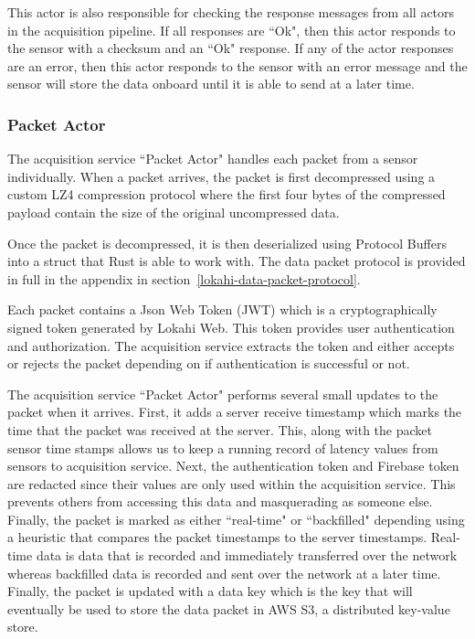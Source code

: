 This actor is also responsible for checking the response messages from all actors in the acquisition pipeline. If all responses are ``Ok", then this actor responds to the sensor with a checksum and an ``Ok" response. If any of the actor responses are an error, then this actor responds to the sensor with an error message and the sensor will store the data onboard until it is able to send at a later time.

\subsubsection{Packet Actor}
The acquisition service ``Packet Actor" handles each packet from a sensor individually. When a packet arrives, the packet is first decompressed using a custom LZ4 compression protocol where the first four bytes of the compressed payload contain the size of the original uncompressed data.

Once the packet is decompressed, it is then deserialized using Protocol Buffers into a struct that Rust is able to work with. The data packet protocol is provided in full in the appendix in section~\ref{lokahi-data-packet-protocol}.

Each packet contains a Json Web Token (JWT) which is a cryptographically signed token generated by Lokahi Web. This token provides user authentication and authorization. The acquisition service extracts the token and either accepts or rejects the packet depending on if authentication is successful or not.

The acquisition service ``Packet Actor" performs several small updates to the packet when it arrives. First, it adds a server receive timestamp which marks the time that the packet was received at the server. This, along with the packet sensor time stamps allows us to keep a running record of latency values from sensors to acquisition service. Next, the authentication token and Firebase token are redacted since their values are only used within the acquisition service. This prevents others from accessing this data and masquerading as someone else. Finally, the packet is marked as either ``real-time" or ``backfilled" depending using a heuristic that compares the packet timestamps to the server timestamps. Real-time data is data that is recorded and immediately transferred over the network whereas backfilled data is recorded and sent over the network at a later time. Finally, the packet is updated with a data key which is the key that will eventually be used to store the data packet in AWS S3, a distributed key-value store.

